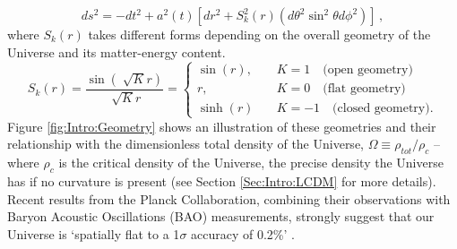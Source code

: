 \begin{equation}
ds^2 = -dt^2 + a^2(t)\left[ dr^2 + S^2_k(r)\left(d\theta^2 \sin^2\theta d\phi^2 \right) \right]\, ,
\label{Eq:Intro:FRW2}
\end{equation}
where $S_k(r)$ takes different forms depending on the overall geometry of the Universe and its matter-energy content. 
\begin{equation}
S_k(r) = \frac{\sin(\sqrt[]{K}r)}{\sqrt[]{K}r} = 
\begin{cases}
\sin (r), & \quad K = 1 \quad \text{(open geometry)} \\
r, & \quad K = 0 \quad \text{(flat geometry)} \\
\sinh (r) & \quad K = -1 \quad \text{(closed geometry)}.
\end{cases}
\label{Eq:Intro:Sk}
\end{equation}
Figure \ref{fig:Intro:Geometry} shows an illustration of these geometries and their relationship with the dimensionless total density of the Universe, $\Omega \equiv \rho_{tot}/\rho_c$ -- where $\rho_c$ is the critical density of the Universe, the precise density the Universe has if no curvature is present (see Section \ref{Sec:Intro:LCDM} for more details). Recent results from the Planck Collaboration, combining their observations with Baryon Acoustic Oscillations (BAO) measurements, strongly suggest that our Universe is `spatially flat to a 1$\sigma$ accuracy of 0.2\%' \citep{2018PlanckCosmology}.

